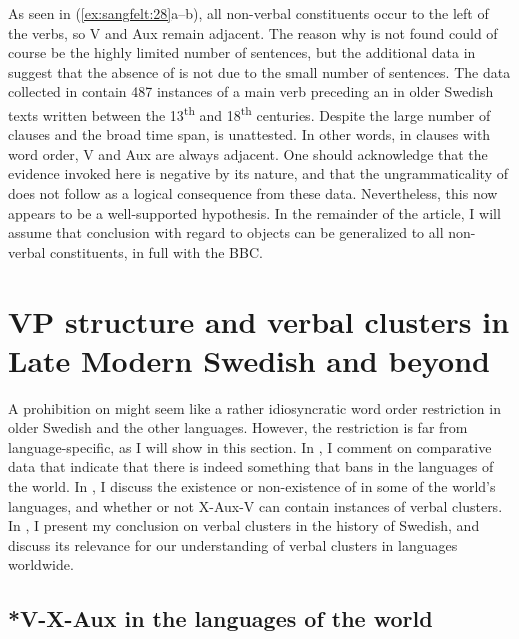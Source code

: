 \documentclass[output=paper, colorlinks, citecolor=brown]{langscibook}
\begin{document}
As seen in (\ref{ex:sangfelt:28}a–b), all non-verbal constituents occur to the left of the verbs, so V and Aux remain adjacent. The reason why  is not found could of course be the highly limited number of sentences, but the additional data in \citet{Sangfelt2019} suggest that the absence of  is not due to the small number of sentences. The data collected in \citet[133]{Sangfelt2019} contain 487 instances of a main verb preceding an  in older Swedish texts written between the 13\textsuperscript{th} and 18\textsuperscript{th} centuries. Despite the large number of clauses and the broad time span,  is unattested. In other words, in clauses with  word order, V and Aux are always adjacent. One should acknowledge that the evidence invoked here is negative by its nature, and that the ungrammaticality of  does not follow as a logical consequence from these data. Nevertheless, this now appears to be a well-supported hypothesis. In the remainder of the article, I will assume that  conclusion with regard to objects can be generalized to all non-verbal constituents, in full  with the BBC.

\section{VP structure and verbal clusters in Late Modern Swedish and beyond}\label{sec:sangfelt:5}

A prohibition on  might seem like a rather idiosyncratic word order restriction in older Swedish and the other  languages. However, the restriction is far from language-specific, as I will show in this section. In , I comment on comparative data that indicate that there is indeed something that bans  in the languages of the world. In , I discuss the existence or non-existence of  in some of the world’s languages, and whether or not X-Aux-V can contain instances of verbal clusters. In , I present my conclusion on verbal clusters in the history of Swedish, and discuss its relevance for our understanding of verbal clusters in languages worldwide.

\subsection{*V-X-Aux in the languages of the world}\label{sec:sangfelt:5.1}
\end{document}
